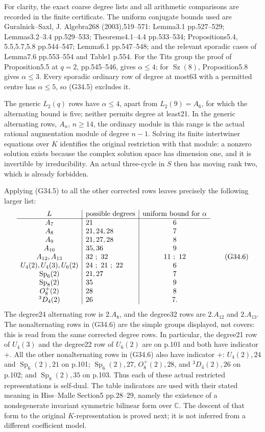 For clarity, the exact coarse degree lists and all arithmetic
comparisons are recorded in the finite certificate. The uniform
conjugate bounds used are Guralnick--Saxl, J. Algebra268
(2003),519--571: Lemma3.1 pp.527--529; Lemmas3.2--3.4
pp.529--533; Theorems4.1--4.4 pp.533--534; Propositions5.4,
5.5,5.7,5.8 pp.544--547; Lemma6.1 pp.547--548; and the
relevant sporadic cases of Lemma7.6 pp.553--554 and Table1
p.554. For the Tits group the proof of Proposition5.5 at
\(q=2\), pp.545--546, gives \(\alpha\le4\); for
\(\operatorname{Sz}(8)\), Proposition5.8 gives \(\alpha\le3\).
Every sporadic ordinary row of degree at most63 with a permitted
centre has \(\alpha\le5\), so (G34.5) excludes it.

The generic \(L_2(q)\) rows have \(\alpha\le4\), apart
from \(L_2(9)=A_6\), for which the alternating bound is five;
neither permits degree at least21. In the generic alternating
rows, \(A_n\), \(n\ge14\), the ordinary module in this range
is the actual rational augmentation module of degree \(n-1\).
Solving its finite intertwiner equations over \(K\) identifies
the original restriction with that module: a nonzero solution
exists because the complex solution space has dimension one,
and it is invertible by irreducibility. An actual three-cycle
in \(S\) then has moving rank two, which is already forbidden.

Applying (G34.5) to all the other corrected rows leaves precisely
the following larger list:
\[
\begin{array}{c|l|c}
L&\hbox{possible degrees}&\hbox{uniform bound for }\alpha\\\hline
A_7&21&6\\
A_8&21,24,28&7\\
A_9&21,27,28&8\\
A_{10}&35,36&9\\
A_{12},A_{13}&32\ ;\ 32&11\ ;\ 12\\
U_4(2),U_4(3),U_6(2)&24\ ;\ 21\ ;\ 22&6\\
\operatorname{Sp}_6(2)&21,27&7\\
\operatorname{Sp}_8(2)&35&9\\
O_8^+(2)&28&8\\
{}^3D_4(2)&26&7.
\end{array}                                             \tag{G34.6}
\]
The degree24 alternating row is \(2.A_8\), and the degree32
rows are \(2.A_{12}\) and \(2.A_{13}\). The nonalternating
rows in (G34.6) are the simple groups displayed, not covers:
this is read from the same corrected degree rows. In particular,
the degree21 row of \(U_4(3)\) and the degree22 row of \(U_6(2)\)
are on p.101 and both have indicator \(+\). All the other
nonalternating rows in (G34.6) also have indicator \(+\):
\(U_4(2),24\) and \(\operatorname{Sp}_6(2),21\) on p.101;
\(\operatorname{Sp}_6(2),27\), \(O_8^+(2),28\),
and \({}^3D_4(2),26\) on p.102; and
\(\operatorname{Sp}_8(2),35\) on p.103.
Thus each of these actual restricted representations is self-dual.
The table indicators are used with their stated meaning in
Hiss--Malle Section5 pp.28--29, namely the existence of a
nondegenerate invariant symmetric bilinear form over \(\mathbb C\).
The descent of that form to the original \(K\)-representation is
proved next; it is not inferred from a different coefficient model.

